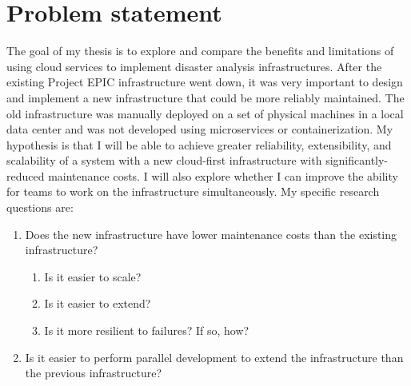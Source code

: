 \chapter{Problem statement}
\OnePageChapter
\label{problemstatement}

The goal of my thesis is to explore and compare the benefits and limitations of using cloud services to implement disaster analysis infrastructures. After the existing Project EPIC infrastructure went down, it was very important to design and implement a new infrastructure that could be more reliably maintained. The old infrastructure was manually deployed on a set of physical machines in a local data center and was not developed using microservices or containerization. My hypothesis is that I will be able to achieve greater reliability, extensibility, and scalability of a system with a new cloud-first infrastructure with significantly-reduced maintenance costs. I will also explore whether I can improve the ability for teams to work on the infrastructure simultaneously.  My specific research questions are:

\begin{enumerate}
    \item Does the new infrastructure have lower maintenance costs than the existing infrastructure? 
    \begin{enumerate}
        \item Is it easier to scale? 
        \item Is it easier to extend? 
        \item Is it more resilient to failures? If so, how?
    \end{enumerate}
    \item Is it easier to perform parallel development to extend the infrastructure than the previous infrastructure?
\end{enumerate}

